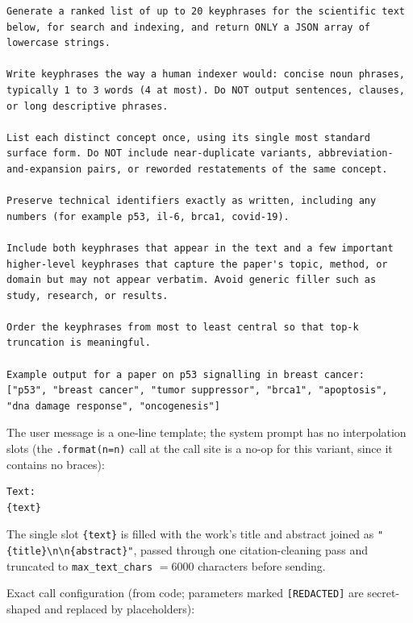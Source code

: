 \begin{lstlisting}
Generate a ranked list of up to 20 keyphrases for the scientific text below, for search and indexing, and return ONLY a JSON array of lowercase strings.

Write keyphrases the way a human indexer would: concise noun phrases, typically 1 to 3 words (4 at most). Do NOT output sentences, clauses, or long descriptive phrases.

List each distinct concept once, using its single most standard surface form. Do NOT include near-duplicate variants, abbreviation-and-expansion pairs, or reworded restatements of the same concept.

Preserve technical identifiers exactly as written, including any numbers (for example p53, il-6, brca1, covid-19).

Include both keyphrases that appear in the text and a few important higher-level keyphrases that capture the paper's topic, method, or domain but may not appear verbatim. Avoid generic filler such as study, research, or results.

Order the keyphrases from most to least central so that top-k truncation is meaningful.

Example output for a paper on p53 signalling in breast cancer:
["p53", "breast cancer", "tumor suppressor", "brca1", "apoptosis", "dna damage response", "oncogenesis"]
\end{lstlisting}

\noindent The user message is a one-line template; the system prompt has no
interpolation slots (the \lstinline|.format(n=n)| call at the call site is a
no-op for this variant, since it contains no braces):

\begin{lstlisting}
Text:
{text}
\end{lstlisting}

\noindent The single slot \lstinline|{text}| is filled with the work's title and
abstract joined as \lstinline|"{title}\n\n{abstract}"|, passed through one
citation-cleaning pass and truncated to \texttt{max\_text\_chars} $=6000$
characters before sending.

\medskip
\noindent Exact call configuration (from code; parameters marked
\texttt{[REDACTED]} are secret-shaped and replaced by placeholders):

